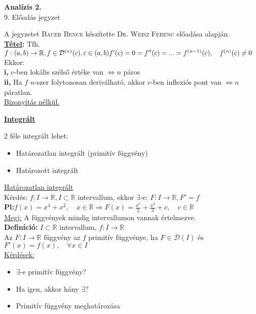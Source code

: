 \documentclass[a4paper,11pt]{article}
\begin{document}
\def\R{\mathbb{R}}
\def\biz{\normalsize{\underline{Bizonyítás:} }\hspace*{0.5cm}}
\def\tetel{\normalsize \textbf{\underline{Tétel}: }}
\def\defi{\normalsize \textbf{Definíció: }}
\def\bizva{\quad\blacksquare}
\def\pl{\textbf{Pl:}}
\def\D{\mathcal{D}}
\def\fabr{f:(a,b)\to\R}
\def\itr{I\to\R}
\def\prfv{primitív függvény}
\begin{center}
	{\LARGE\textbf{Analízis 2.}}\\[0.2cm]
	
	{\Large 9. Előadás jegyzet}\\[0.5cm]	
\end{center}
{\small A jegyzetet \textsc{Bauer Bence} készítette \textsc{Dr. Weisz Ferenc} előadása alapján.}\\[0.4cm]
\tetel Tfh. $\fabr,f\in\D^{(n)}(c),c\in(a,b)\\[0.2cm]
f'(c)=0=f''(c)=...=f^{(n-1)}(c),\quad f^{(n)}(c)\neq0\quad$Ekkor:\\[0.2cm]
\textbf{i,} $c$-ben lokális szélső értéke van $\Leftrightarrow n$ páros\\[0.2cm]
\textbf{ii,} Ha $f$ $n$-szer folytonosan deriválható, akkor $c$-ben inflexiós
pont van $\Leftrightarrow n$ páratlan.\\[0.2cm]\underline{Bizonyítás nélkül.}
\begin{center}
	{\Large\textbf{\underline{Integrált}}}
\end{center}
2 féle integrált lehet:
\begin{itemize}
	\item Határozatlan integrált (\prfv)
	\item Határozott integrált
\end{itemize}
{\large\underline{Határozatlan integrált}}\\[0.2cm]
Kérdés: $f:\itr,I\subset\R$ intervallum, ekkor $\exists$-e: $F:\itr,F'=f$\\[0.2cm]
\pl $f(x)=x^4+x^2,\quad x\in\R\Rightarrow F(x)=\frac{x^5}{5}+\frac{x^3}{3}+c,\quad
c\in\R$\\[0.2cm]\underline{Megj:} A függvények mindig intervallumon vannak értelmezve.\\[0.2cm]\defi $I\subset\R$ intervallum, $f:\itr$\\[0.1cm]
Az $F:\itr$ függvény az $f$ \prfv e, ha $F\in\D(I)$ és $F'(x)=f(x),\quad\forall
x\in I$\\[0.2cm]\underline{Kérdések:}
\begin{itemize}
	\item $\exists$-e \prfv ?
	\item Ha igen, akkor hány $\exists$?
	\item Primitív függvény meghatározása
\end{itemize}
\end{document}
